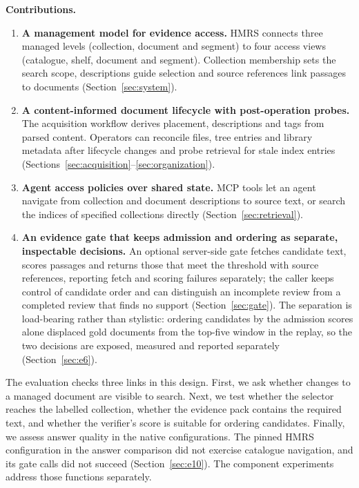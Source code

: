 \noindent\textbf{Contributions.}
\begin{enumerate}
\item \textbf{A management model for evidence access.} HMRS connects
three managed levels (collection, document and segment) to four access
views (catalogue, shelf, document and segment). Collection membership
sets the search scope, descriptions guide selection and source references
link passages to documents (Section~\ref{sec:system}).
\item \textbf{A content-informed document lifecycle with post-operation
probes.} The acquisition workflow derives placement, descriptions and
tags from parsed content. Operators can reconcile files, tree entries
and library metadata after lifecycle changes and probe retrieval for
stale index entries
(Sections~\ref{sec:acquisition}--\ref{sec:organization}).
\item \textbf{Agent access policies over shared state.} MCP tools let an
agent navigate from collection and document descriptions to source text,
or search the indices of specified collections directly
(Section~\ref{sec:retrieval}).
\item \textbf{An evidence gate that keeps admission and ordering as
separate, inspectable decisions.} An optional server-side gate fetches
candidate text, scores passages and returns those that meet the threshold
with source references, reporting fetch and scoring failures separately;
the caller keeps control of candidate order and can distinguish an
incomplete review from a completed review that finds no support
(Section~\ref{sec:gate}). The separation is load-bearing rather than
stylistic: ordering candidates by the admission scores alone displaced
gold documents from the top-five window in the replay, so the two
decisions are exposed, measured and reported separately
(Section~\ref{sec:e6}).
\end{enumerate}

The evaluation checks three links in this design. First, we ask whether
changes to a managed document are visible to search. Next, we test whether
the selector reaches the labelled collection, whether the evidence pack
contains the required text, and whether the verifier's score is suitable
for ordering candidates. Finally, we assess answer quality in the native configurations. The pinned
HMRS configuration in the answer comparison did not exercise catalogue
navigation, and its gate calls did not succeed (Section~\ref{sec:e10}).
The component experiments address those functions separately.

